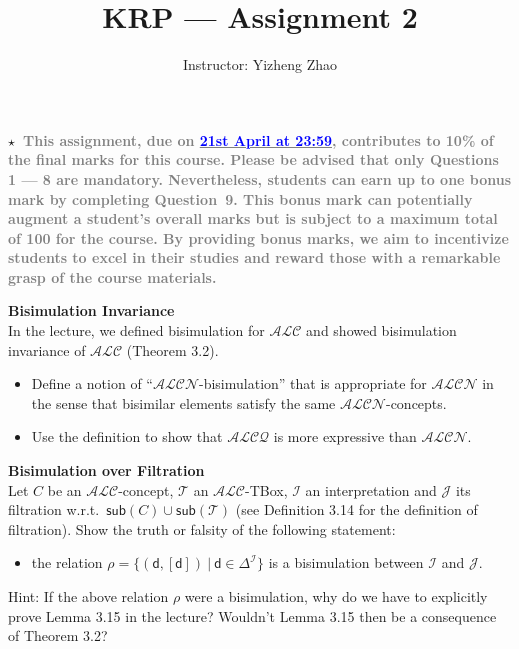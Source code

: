 \documentclass[12pt,a4paper]{article}
\newenvironment{problem}[2][{\color{red}Question}]{\begin{trivlist}
\item[\hskip \labelsep {\bfseries #1}\hskip \labelsep {\bfseries #2.}]}{\end{trivlist}}
\begin{document}
\title{{\color{blue}KRP --- Assignment 2}}
\author{Instructor: Yizheng Zhao}

 
\maketitle

\textbf{$\star$~\textcolor{gray}{This assignment, due on \underline{\textcolor{blue}{21st April at 23:59}}, contributes to 10\% of the final marks for this course. Please be advised that only Questions 1 --- 8 are mandatory. Nevertheless, students can earn up to one bonus mark by completing Question~9. This bonus mark can potentially augment a student's overall marks but is subject to a maximum total of 100 for the course. By providing bonus marks, we aim to incentivize students to excel in their studies and reward those with a remarkable grasp of the course materials.}}

\begin{problem}{{\color{red}1}}
\textbf{Bisimulation Invariance}\\
In the lecture, we defined bisimulation for $\mathcal{ALC}$ and showed bisimulation invariance of $\mathcal{ALC}$ (Theorem 3.2).
\begin{itemize}
    \item Define a notion of ``$\mathcal{ALCN}$-bisimulation'' that is appropriate for $\mathcal{ALCN}$ in the sense that bisimilar elements satisfy the same $\mathcal{ALCN}$-concepts.
    \item Use the definition to show that $\mathcal{ALCQ}$ is more expressive than $\mathcal{ALCN}$.
\end{itemize}
\end{problem}


\begin{problem}{{\color{red}2}}
\textbf{Bisimulation over Filtration}\\
Let $C$ be an $\mathcal{ALC}$-concept, $\mathcal{T}$ an $\mathcal{ALC}$-TBox, $\mathcal{I}$ an interpretation and $\mathcal{J}$ its filtration w.r.t.\ $\textsf{sub}(C)\cup\textsf{sub}(\mathcal{T})$ (see Definition 3.14 for the definition of filtration). Show the truth or falsity of the following statement:
\begin{itemize}
    \item the relation $\rho=\{(\textsf{d}, [\textsf{d}])~|~\textsf{d}\in\Delta^{\mathcal{I}}\}$ is a bisimulation between $\mathcal{I}$ and $\mathcal{J}$.
\end{itemize}
Hint:  If the above relation $\rho$ were a bisimulation, why do we have to explicitly prove Lemma 3.15 in the lecture? Wouldn't Lemma 3.15 then be a consequence of Theorem 3.2?

\end{problem}
\end{document}
